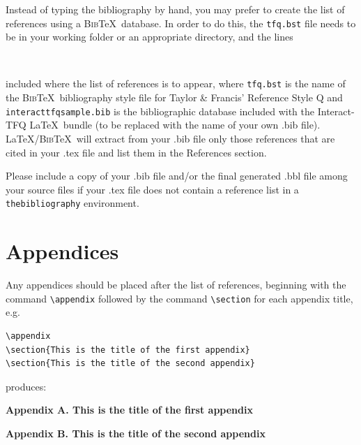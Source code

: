 \documentclass[]{interact}
\theoremstyle{plain}%
\theoremstyle{definition}
\theoremstyle{remark}
\begin{document}
Instead of typing the bibliography by hand, you may prefer to create the list of references using a \textsc{Bib}\TeX\ database. In order to do this, the \texttt{tfq.bst} file needs to be in your working folder or an appropriate directory, and the lines
\begin{verbatim}


\end{verbatim}
included where the list of references is to appear, where \texttt{tfq.bst} is the name of the \textsc{Bib}\TeX\ bibliography style file for Taylor \& Francis' Reference Style Q and \texttt{interacttfqsample.bib} is the bibliographic database included with the \textsf{Interact}-TFQ \LaTeX\ bundle (to be replaced with the name of your own .bib file). \LaTeX/\textsc{Bib}\TeX\ will extract from your .bib file only those references that are cited in your .tex file and list them in the References section.

Please include a copy of your .bib file and/or the final generated .bbl file among your source files if your .tex file does not contain a reference list in a \texttt{thebibliography} environment.


\section{Appendices}

Any appendices should be placed after the list of references, beginning with the command \verb"\appendix" followed by the command \verb"\section" for each appendix title, e.g.
\begin{verbatim}
\appendix
\section{This is the title of the first appendix}
\section{This is the title of the second appendix}
\end{verbatim}
produces:\medskip

\noindent\textbf{Appendix A. This is the title of the first appendix}\medskip

\noindent\textbf{Appendix B. This is the title of the second appendix}\medskip
\end{document}
